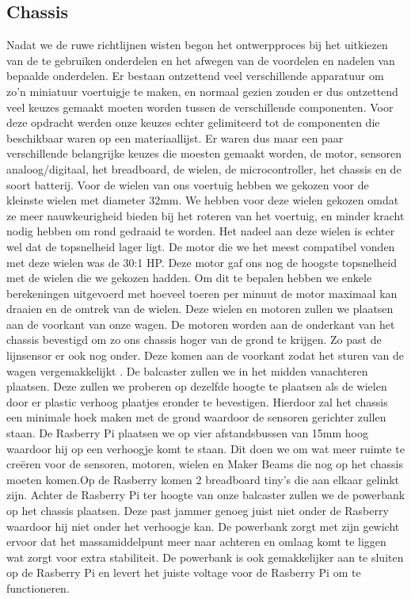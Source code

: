 \documentclass[a4paper,kulak]{kulakarticle}
\begin{document}
\subsection{Chassis}
Nadat we de ruwe richtlijnen wisten begon het ontwerpproces bij het uitkiezen van de te gebruiken onderdelen en het afwegen van de voordelen en nadelen van bepaalde onderdelen. Er bestaan ontzettend veel verschillende apparatuur om zo’n miniatuur voertuigje te maken, en normaal gezien zouden er dus ontzettend veel keuzes gemaakt moeten worden tussen de verschillende componenten. Voor deze opdracht werden onze keuzes echter gelimiteerd tot de componenten die beschikbaar waren op een materiaallijst. Er waren dus maar een paar verschillende belangrijke keuzes die moesten gemaakt worden, de motor, sensoren analoog/digitaal, het breadboard, de wielen, de microcontroller, het chassis en de soort batterij. Voor de wielen van ons voertuig hebben we gekozen voor de kleinste wielen met diameter 32mm. We hebben voor deze wielen gekozen omdat ze meer nauwkeurigheid bieden bij het roteren van het voertuig, en minder kracht nodig hebben om rond gedraaid te worden. Het nadeel aan deze wielen is echter wel dat de topsnelheid lager ligt. De motor die we het meest compatibel vonden met deze wielen was de 30:1 HP. Deze motor gaf ons nog de hoogste topsnelheid met de wielen die we gekozen hadden. Om dit te bepalen hebben we enkele berekeningen uitgevoerd met hoeveel toeren per minuut de motor maximaal kan draaien en de omtrek van de wielen. Deze wielen en motoren zullen we plaatsen aan de voorkant van onze wagen. De motoren worden aan de onderkant van het chassis bevestigd om zo ons chassis hoger van de grond te krijgen. Zo past de lijnsensor er ook nog onder. Deze komen aan de voorkant zodat het sturen van de wagen vergemakkelijkt . De balcaster zullen we in het midden vanachteren plaatsen. Deze zullen we proberen op dezelfde hoogte te plaatsen als de wielen door er plastic verhoog plaatjes eronder te bevestigen. Hierdoor zal het chassis een minimale hoek maken met de grond waardoor de sensoren gerichter zullen staan. De Rasberry Pi plaatsen we op vier afstandsbussen van 15mm hoog waardoor hij op een verhoogje komt te staan. Dit doen we om wat meer ruimte te creëren voor de sensoren, motoren, wielen en Maker Beams die nog op het chassis moeten komen.Op de Rasberry komen 2  breadboard tiny’s die aan elkaar gelinkt zijn. Achter de Rasberry Pi ter hoogte van onze balcaster zullen we de powerbank op het chassis plaatsen. Deze past jammer genoeg juist niet onder de Rasberry waardoor hij niet onder het verhoogje kan. De powerbank zorgt met zijn gewicht ervoor dat het massamiddelpunt meer naar achteren en omlaag komt te liggen wat zorgt voor extra stabiliteit. De powerbank is ook gemakkelijker aan te sluiten op de Rasberry Pi en levert het juiste voltage voor de Rasberry Pi om te functioneren.
\end{document}
